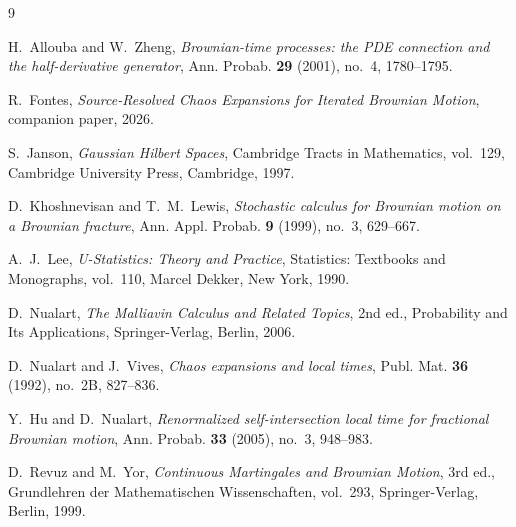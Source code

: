 \documentclass[11pt,reqno]{amsart}
\theoremstyle{plain}
\theoremstyle{definition}
\theoremstyle{remark}
\begin{document}
\begin{thebibliography}{9}

H.~Allouba and W.~Zheng,
\emph{Brownian-time processes: the PDE connection and the half-derivative generator},
Ann. Probab. \textbf{29} (2001), no.~4, 1780--1795.

R.~Fontes,
\emph{Source-Resolved Chaos Expansions for Iterated Brownian Motion},
companion paper, 2026.

S.~Janson,
\emph{Gaussian Hilbert Spaces},
Cambridge Tracts in Mathematics, vol.~129,
Cambridge University Press, Cambridge, 1997.

D.~Khoshnevisan and T.~M.~Lewis,
\emph{Stochastic calculus for Brownian motion on a Brownian fracture},
Ann. Appl. Probab. \textbf{9} (1999), no.~3, 629--667.

A.~J.~Lee,
\emph{U-Statistics: Theory and Practice},
Statistics: Textbooks and Monographs, vol.~110,
Marcel Dekker, New York, 1990.

D.~Nualart,
\emph{The Malliavin Calculus and Related Topics},
2nd ed., Probability and Its Applications, Springer-Verlag, Berlin, 2006.

D.~Nualart and J.~Vives,
\emph{Chaos expansions and local times},
Publ. Mat. \textbf{36} (1992), no.~2B, 827--836.

Y.~Hu and D.~Nualart,
\emph{Renormalized self-intersection local time for fractional Brownian motion},
Ann. Probab. \textbf{33} (2005), no.~3, 948--983.

D.~Revuz and M.~Yor,
\emph{Continuous Martingales and Brownian Motion},
3rd ed., Grundlehren der Mathematischen Wissenschaften, vol.~293,
Springer-Verlag, Berlin, 1999.

\end{thebibliography}
\end{document}
